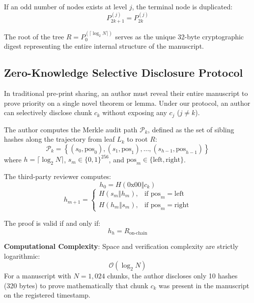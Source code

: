 \documentclass[conference]{IEEEtran}
\begin{document}
If an odd number of nodes exists at level $j$, the terminal node is duplicated:
\begin{equation}
P_{2k+1}^{(j)} = P_{2k}^{(j)}
\end{equation}

The root of the tree $R = P_{0}^{(\lceil \log_2 N \rceil)}$ serves as the unique 32-byte cryptographic digest representing the entire internal structure of the manuscript.

\subsection{Zero-Knowledge Selective Disclosure Protocol}
In traditional pre-print sharing, an author must reveal their entire manuscript to prove priority on a single novel theorem or lemma. Under our protocol, an author can selectively disclose chunk $c_k$ without exposing any $c_j$ ($j \neq k$).

The author computes the Merkle audit path $\mathcal{P}_k$, defined as the set of sibling hashes along the trajectory from leaf $L_k$ to root $R$:
\begin{equation}
\mathcal{P}_k = \left\{ (s_0, \text{pos}_0), (s_1, \text{pos}_1), \dots, (s_{h-1}, \text{pos}_{h-1}) \right\}
\end{equation}
where $h = \lceil \log_2 N \rceil$, $s_m \in \{0, 1\}^{256}$, and $\text{pos}_m \in \{\text{left}, \text{right}\}$.

The third-party reviewer computes:
\begin{equation}
h_0 = H(0\text{x}00 \mathbin{\Vert} c_k)
\end{equation}
\begin{equation}
h_{m+1} = \begin{cases} 
H(s_m \mathbin{\Vert} h_m), & \text{if } \text{pos}_m = \text{left} \\ 
H(h_m \mathbin{\Vert} s_m), & \text{if } \text{pos}_m = \text{right} 
\end{cases}
\end{equation}

The proof is valid if and only if:
\begin{equation}
h_h = R_{\text{on-chain}}
\end{equation}

\textbf{Computational Complexity}: Space and verification complexity are strictly logarithmic:
\begin{equation}
\mathcal{O}(\log_2 N)
\end{equation}
For a manuscript with $N = 1,024$ chunks, the author discloses only 10 hashes (320 bytes) to prove mathematically that chunk $c_k$ was present in the manuscript on the registered timestamp.
\end{document}
